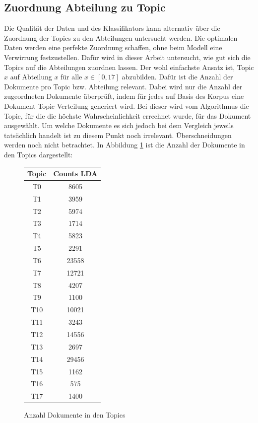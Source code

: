 \documentclass[german,version-2020-11]{uzl-thesis}
\begin{document}
\subsection{Zuordnung Abteilung zu Topic}
Die Qualität der Daten und des Klassifikators kann alternativ über die Zuordnung der Topics zu den Abteilungen untersucht werden. Die optimalen Daten werden eine perfekte Zuordnung schaffen, ohne beim Modell eine Verwirrung festzustellen. Dafür wird in dieser Arbeit untersucht, wie gut sich die Topics auf die Abteilungen zuordnen lassen. Der wohl einfachste Ansatz ist, Topic $x$ auf Abteilung $x$ für alle $x \in [0,17]$ abzubilden. Dafür ist die Anzahl der Dokumente pro Topic bzw. Abteilung relevant. Dabei wird nur die Anzahl der zugeordneten Dokumente überprüft, indem für jedes auf Basis des Korpus eine Dokument-Topic-Verteilung generiert wird. Bei dieser wird vom Algorithmus die Topic, für die die höchste Wahrscheinlichkeit errechnet wurde, für das Dokument ausgewählt. Um welche Dokumente es sich jedoch bei dem Vergleich jeweils tatsächlich handelt ist zu diesem Punkt noch irrelevant. Überschneidungen werden noch nicht betrachtet. In Abbildung \ref{fig:count1} ist die Anzahl der Dokumente in den Topics dargestellt:

\begin{figure}[H]
\begin{center}
\begin{tabular}{cc}
\hline 
\hline
Topic&Counts LDA\\
\hline
T0&8605\\
T1&3959\\
T2&5974\\
T3&1714\\
T4&5823\\
T5&2291\\
T6&23558\\
T7&12721\\
T8&4207\\
T9&1100\\
T10&10021\\
T11&3243\\
T12&14556\\
T13&2697\\
T14&29456\\
T15&1162\\
T16&575\\
T17&1400\\
\hline
\hline
\end{tabular}
\caption{Anzahl Dokumente in den Topics}
\label{fig:count1}
\end{center}
\end{figure}
\end{document}
